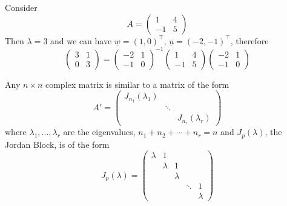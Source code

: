 \begin{example}
    Consider
    $$A=\begin{pmatrix}
        1&4\\
        -1&5
    \end{pmatrix}$$
    Then $\lambda=3$ and we can have $\underline{w}=(1,0)^\top$, $\underline{u}=(-2,-1)^\top$, therefore
    $$\begin{pmatrix}
        3&1\\
        0&3
    \end{pmatrix}=
    \begin{pmatrix}
        -2&1\\
        -1&0
    \end{pmatrix}^{-1}
    \begin{pmatrix}
        1&4\\
        -1&5
    \end{pmatrix}
    \begin{pmatrix}
        -2&1\\
        -1&0
    \end{pmatrix}$$
\end{example}
\begin{theorem}
    Any $n\times n$ complex matrix is similar to a matrix of the form
    $$A'=
    \begin{pmatrix}
        J_{n_1}(\lambda_1)&&\\
        &\ddots&\\
        &&J_{n_r}(\lambda_r)
    \end{pmatrix}$$
    where $\lambda_1,\ldots,\lambda_r$ are the eigenvalues, $n_1+n_2+\cdots+n_r=n$ and $J_p(\lambda)$, the Jordan Block, is of the form
    $$J_p(\lambda)=\begin{pmatrix}
        \lambda&1&&&\\
        &\lambda&1&&\\
        &&\lambda&&\\
        &&&\ddots&1\\
        &&&&\lambda
    \end{pmatrix}$$
\end{theorem}
